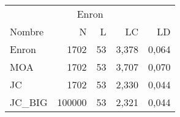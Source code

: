 \begin{tabular}{lrrrr}
	\toprule
	\multicolumn{5}{c}{Enron}             \\
	Nombre  & N      & L  & LC    & LD    \\
	\midrule
	Enron   & 1702   & 53 & 3,378 & 0,064 \\
	MOA     & 1702   & 53 & 3,707 & 0,070 \\
	JC      & 1702   & 53 & 2,330 & 0,044 \\
	JC\_BIG & 100000 & 53 & 2,321 & 0,044 \\
	\bottomrule
\end{tabular}
